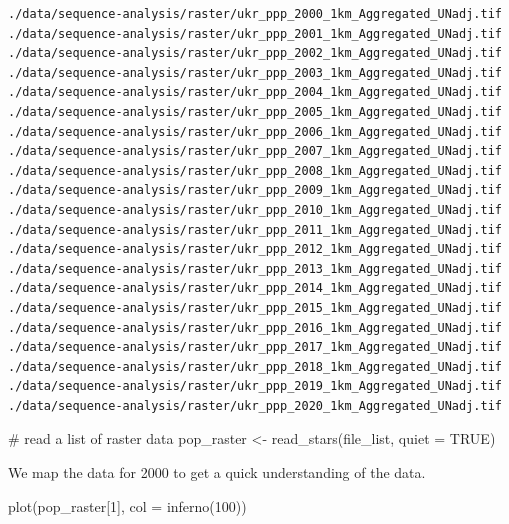 \documentclass[
  letterpaper,
  DIV=11,
  numbers=noendperiod]{scrreprt}
\newenvironment{Shaded}{\begin{snugshade}}{\end{snugshade}}
\newcommand{\AttributeTok}[1]{\textcolor[rgb]{0.40,0.45,0.13}{#1}}
\newcommand{\CommentTok}[1]{\textcolor[rgb]{0.37,0.37,0.37}{#1}}
\newcommand{\ConstantTok}[1]{\textcolor[rgb]{0.56,0.35,0.01}{#1}}
\newcommand{\DecValTok}[1]{\textcolor[rgb]{0.68,0.00,0.00}{#1}}
\newcommand{\FunctionTok}[1]{\textcolor[rgb]{0.28,0.35,0.67}{#1}}
\newcommand{\NormalTok}[1]{\textcolor[rgb]{0.00,0.23,0.31}{#1}}
\newcommand{\OtherTok}[1]{\textcolor[rgb]{0.00,0.23,0.31}{#1}}
\begin{document}
\begin{verbatim}
./data/sequence-analysis/raster/ukr_ppp_2000_1km_Aggregated_UNadj.tif
./data/sequence-analysis/raster/ukr_ppp_2001_1km_Aggregated_UNadj.tif
./data/sequence-analysis/raster/ukr_ppp_2002_1km_Aggregated_UNadj.tif
./data/sequence-analysis/raster/ukr_ppp_2003_1km_Aggregated_UNadj.tif
./data/sequence-analysis/raster/ukr_ppp_2004_1km_Aggregated_UNadj.tif
./data/sequence-analysis/raster/ukr_ppp_2005_1km_Aggregated_UNadj.tif
./data/sequence-analysis/raster/ukr_ppp_2006_1km_Aggregated_UNadj.tif
./data/sequence-analysis/raster/ukr_ppp_2007_1km_Aggregated_UNadj.tif
./data/sequence-analysis/raster/ukr_ppp_2008_1km_Aggregated_UNadj.tif
./data/sequence-analysis/raster/ukr_ppp_2009_1km_Aggregated_UNadj.tif
./data/sequence-analysis/raster/ukr_ppp_2010_1km_Aggregated_UNadj.tif
./data/sequence-analysis/raster/ukr_ppp_2011_1km_Aggregated_UNadj.tif
./data/sequence-analysis/raster/ukr_ppp_2012_1km_Aggregated_UNadj.tif
./data/sequence-analysis/raster/ukr_ppp_2013_1km_Aggregated_UNadj.tif
./data/sequence-analysis/raster/ukr_ppp_2014_1km_Aggregated_UNadj.tif
./data/sequence-analysis/raster/ukr_ppp_2015_1km_Aggregated_UNadj.tif
./data/sequence-analysis/raster/ukr_ppp_2016_1km_Aggregated_UNadj.tif
./data/sequence-analysis/raster/ukr_ppp_2017_1km_Aggregated_UNadj.tif
./data/sequence-analysis/raster/ukr_ppp_2018_1km_Aggregated_UNadj.tif
./data/sequence-analysis/raster/ukr_ppp_2019_1km_Aggregated_UNadj.tif
./data/sequence-analysis/raster/ukr_ppp_2020_1km_Aggregated_UNadj.tif
\end{verbatim}

\begin{Shaded}
\begin{Highlighting}[]
\CommentTok{\# read a list of raster data}
\NormalTok{pop\_raster }\OtherTok{\textless{}{-}} \FunctionTok{read\_stars}\NormalTok{(file\_list, }\AttributeTok{quiet =} \ConstantTok{TRUE}\NormalTok{)}
\end{Highlighting}
\end{Shaded}

We map the data for 2000 to get a quick understanding of the data.

\begin{Shaded}
\begin{Highlighting}[]
\FunctionTok{plot}\NormalTok{(pop\_raster[}\DecValTok{1}\NormalTok{], }\AttributeTok{col =} \FunctionTok{inferno}\NormalTok{(}\DecValTok{100}\NormalTok{))}
\end{Highlighting}
\end{Shaded}
\end{document}
